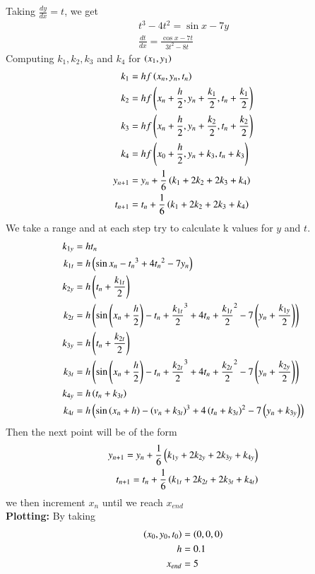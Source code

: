 \documentclass[journal]{IEEEtran}
\begin{document}
Taking $\frac{dy}{dx}=t$, we get
\begin{align}
t^3-4t^2=\sin x-7y\\
\frac{dt}{dx}=\frac{\cos x-7t}{3t^2-8t}
\end{align}
Computing $k_1,k_2,k_3$ and $k_4$ for $\left(x_1,y_1\right)$
\begin{align}
k_1&=hf\left(x_n,y_n,t_n\right)\\
k_2&=hf\left(x_n+\frac{h}{2},y_n+\frac{k_1}{2},t_n+\frac{k_1}{2}\right)\\
k_3&=hf\left(x_n+\frac{h}{2},y_n+\frac{k_2}{2},t_n+\frac{k_2}{2}\right)\\
k_4&=hf\left(x_0+\frac{h}{2},y_n+k_3,t_n+k_3\right)\\
y_{n+1}&=y_n+\frac{1}{6}\left(k_1+2k_2+2k_3+k_4\right)\\
t_{n+1}&=t_n+\frac{1}{6}\left(k_1+2k_2+2k_3+k_4\right)
\end{align}
We take a range  and at each step try to calculate k values for $y$ and $t$.
\begin{align}
k_{1y}&= ht_n\\
k_{1t}&=h\left(\sin x_n-{t_n}^3+4{t_n}^2-7y_n\right)\\
k_{2y}&= h\left(t_n+\frac{k_{1t}}{2}\right)\\
k_{2t}&=h\left(\sin \left(x_n+\frac{h}{2}\right)-{t_n+\frac{k_{1t}}{2}}^3+4{t_n+\frac{k_{1t}}{2}}^2-7\left(y_n+\frac{k_{1y}}{2}\right)\right)\\
k_{3y}&= h\left(t_n+\frac{k_{2t}}{2}\right)\\
k_{3t}&=h\left(\sin \left(x_n+\frac{h}{2}\right)-{t_n+\frac{k_{2t}}{2}}^3+4{t_n+\frac{k_{2t}}{2}}^2-7\left(y_n+\frac{k_{2y}}{2}\right)\right)\\
k_{4y}&=h\left(t_n+k_{3t}\right)\\
k_{4t}&=h\left(\sin\left(x_n+h\right)-\left(v_n+k_{3t}\right)^3+4\left(t_n+k_{3t}\right)^2-7\left(y_n+k_{3y}\right)\right)
\end{align}
Then the next point will be of the form 
\begin{align}
y_{n+1}=y_n+\frac{1}{6}\left(k_{1y}+2k_{2y}+2k_{3y}+k_{4y}\right)\\
t_{n+1}=t_n+\frac{1}{6}\left(k_{1t}+2k_{2t}+2k_{3t}+k_{4t}\right)
\end{align}
we then increment $x_n$ until we reach $x_{end}$\\
\textbf{Plotting:}
By taking 
\begin{align}
\left(x_0,y_0,t_0\right)&=\left(0,0,0\right)\\
h&=0.1\\
x_{end}&=5
\end{align}
\end{document}
